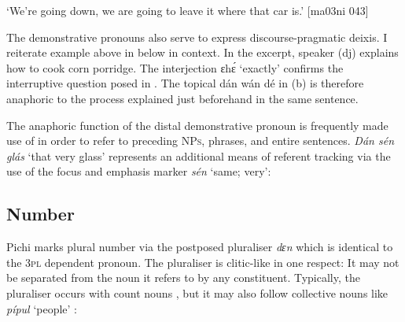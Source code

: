 \glt ‘We’re going down, we are going to leave it where that car is.’ [ma03ni 043]
\z

The demonstrative pronouns also serve to express discourse-pragmatic deixis. I reiterate example  above in  below in context. In the excerpt, speaker (dj) explains how to cook corn porridge. The interjection ɛhɛ́ ‘exactly’ confirms the interruptive question posed in . The topical dán wán dé in (b) is therefore anaphoric to the process explained just beforehand in the same sentence. 


The anaphoric function of the distal demonstrative pronoun is frequently made use of in order to refer to preceding \textsc{NPs}, phrases, and entire sentences. \textit{Dán sén glás} ‘that very glass’ represents  an additional means of referent tracking via the use of the focus and emphasis marker \textit{sén} ‘same; very’: 



\ea%
    \label{ex:key:206}
\z
\z

\subsection{Number}

Pichi marks plural number via the postposed pluraliser \textit{dɛn} which is identical to the \textsc{3pl} dependent pronoun. The pluraliser is clitic-like in one respect: It may not be separated from the noun it refers to by any constituent. Typically, the pluraliser occurs with count nouns , but it may also follow collective nouns like \textit{pípul} ‘people’ : 


